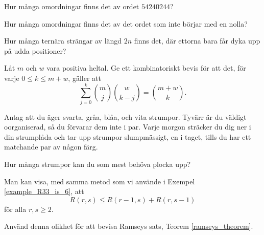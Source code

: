 \documentclass[nobib]{tufte-handout}
\begin{document}
\begin{xca}
  Hur många omordningar finns det av ordet $54240244$?

  Hur många omordningar finns det av det ordet som inte börjar med en nolla?
\end{xca}

\begin{xca}
  Hur många ternära strängar av längd $2n$ finns det, där ettorna bara får dyka upp på udda positioner?
\end{xca}

\begin{xca}
  Låt $m$ och $w$ vara positiva heltal. Ge ett kombinatoriskt bevis för att det, för varje $0 \leq k \leq m + w$, gäller att
  $$\sum_{j=0}^k \binom{m}{j}\binom{w}{k-j} = \binom{m + w}{k}.$$
\end{xca}

\begin{xca}
  Antag att du äger svarta, gråa, blåa, och vita strumpor. Tyvärr är du väldigt oorganiserad, så du förvarar dem inte i par. Varje morgon sträcker du dig ner i din strumplåda och tar upp strumpor slumpmässigt, en i taget, tills du har ett matchande par av någon färg.

  Hur många strumpor kan du som mest behöva plocka upp?
\end{xca}

\begin{xca}
  Man kan visa, med samma metod som vi använde i Exempel \ref{example_R33_is_6}, att
  $$R(r,s) \leq R(r-1,s) + R(r, s-1)$$
  för alla $r, s \geq 2$.

  Använd denna olikhet för att bevisa Ramseys sats, Teorem \ref{ramseys_theorem}.
\end{xca}

%
%
\end{document}
